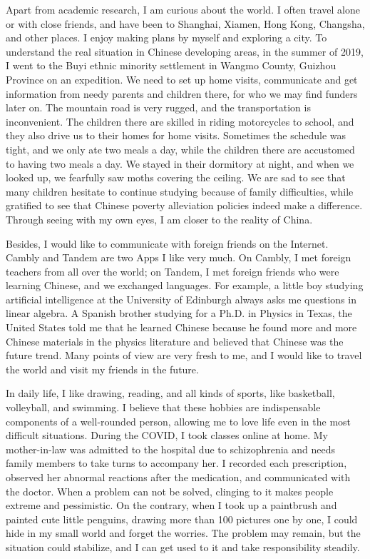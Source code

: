 \documentclass{article}
\numberwithin{equation}{section}
\begin{document}
Apart from academic research, I am curious about the world. I often travel alone or with close friends, and have been to Shanghai, Xiamen, Hong Kong, Changsha, and other places. I enjoy making plans by myself and exploring a city. To understand the real situation in Chinese developing areas, in the summer of 2019, I went to the Buyi ethnic minority settlement in Wangmo County, Guizhou Province on an expedition. We need to set up home visits, communicate and get information from needy parents and children there, for who we may find funders later on. The mountain road is very rugged, and the transportation is inconvenient. The children there are skilled in riding motorcycles to school, and they also drive us to their homes for home visits. Sometimes the schedule was tight, and we only ate two meals a day, while the children there are accustomed to having two meals a day. We stayed in their dormitory at night, and when we looked up, we fearfully saw moths covering the ceiling. We are sad to see that many children hesitate to continue studying because of family difficulties, while gratified to see that Chinese poverty alleviation policies indeed make a difference. Through seeing with my own eyes, I am closer to the reality of China.

Besides, I would like to communicate with foreign friends on the Internet. Cambly and Tandem are two Apps I like very much. On Cambly, I met foreign teachers from all over the world; on Tandem, I met foreign friends who were learning Chinese, and we exchanged languages.  For example, a little boy studying artificial intelligence at the University of Edinburgh always asks me questions in linear algebra. A Spanish brother studying for a Ph.D. in Physics in Texas, the United States told me that he learned Chinese because he found more and more Chinese materials in the physics literature and believed that Chinese was the future trend. Many points of view are very fresh to me, and I would like to travel the world and visit my friends in the future.

In daily life, I like drawing, reading, and all kinds of sports, like basketball, volleyball, and swimming. I believe that these hobbies are indispensable components of a well-rounded person, allowing me to love life even in the most difficult situations. During the COVID, I took classes online at home. My mother-in-law was admitted to the hospital due to schizophrenia and needs family members to take turns to accompany her. I recorded each prescription, observed her abnormal reactions after the medication, and communicated with the doctor. When a problem can not be solved, clinging to it makes people extreme and pessimistic. On the contrary, when I took up a paintbrush and painted cute little penguins,  drawing more than 100 pictures one by one, I could hide in my small world and forget the worries. The problem may remain, but the situation could stabilize, and I can get used to it and take responsibility steadily.
\end{document}
